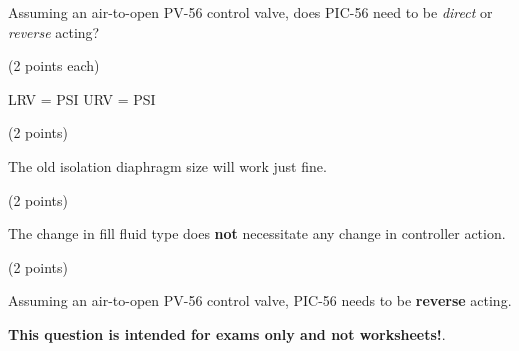 \vskip 10pt

Assuming an air-to-open PV-56 control valve, does PIC-56 need to be {\it direct} or {\it reverse} acting?







\noindent
(2 points each)

LRV =  PSI \hskip 30pt  URV =  PSI

\vskip 10pt

\noindent
(2 points)

The old isolation diaphragm size will work just fine.

\vskip 10pt

\noindent
(2 points)

The change in fill fluid type does {\bf not} necessitate any change in controller action.

\vskip 10pt

\noindent
(2 points)

Assuming an air-to-open PV-56 control valve, PIC-56 needs to be {\bf reverse} acting.








{\bf This question is intended for exams only and not worksheets!}.



